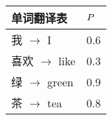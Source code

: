 

{\small
\begin{tabular}{l | l}
单词翻译表 & ${P}$ \\ \hline
我 $\to$ I & 0.6 \\
喜欢 $\to$ like & 0.3 \\
绿 $\to$ green & 0.9 \\
茶 $\to$ tea & 0.8 \\
\end{tabular}
}

